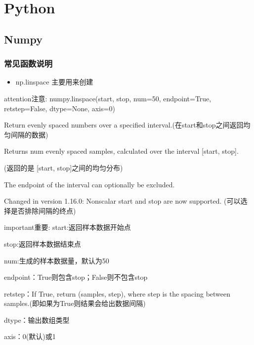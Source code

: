 \documentclass[a4paper,12pt,english]{sphinxmanual}
\begin{document}
\section{Python}
\label{\detokenize{note:python}}

\subsection{Numpy}
\label{\detokenize{note/python/numpy:numpy}}\label{\detokenize{note/python/numpy::doc}}

\subsubsection{常见函数说明}
\label{\detokenize{note/python/numpy:id1}}\begin{itemize}
\item {} 
\sphinxAtStartPar
np.linspace 主要用来创建 

\end{itemize}

\begin{sphinxadmonition}{attention}{注意:}
\sphinxAtStartPar
numpy.linspace(start, stop, num=50, endpoint=True, retstep=False, dtype=None, axis=0)

\sphinxAtStartPar
Return evenly spaced numbers over a specified interval.(在start和stop之间返回均匀间隔的数据)

\sphinxAtStartPar
Returns num evenly spaced samples, calculated over the interval {[}start, stop{]}.

\sphinxAtStartPar
(返回的是 {[}start, stop{]}之间的均匀分布)

\sphinxAtStartPar
The endpoint of the interval can optionally be excluded.

\sphinxAtStartPar
Changed in version 1.16.0: Non\sphinxhyphen{}scalar start and stop are now supported. (可以选择是否排除间隔的终点)
\end{sphinxadmonition}

\begin{sphinxadmonition}{important}{重要:}
\sphinxAtStartPar
start:返回样本数据开始点

\sphinxAtStartPar
stop:返回样本数据结束点

\sphinxAtStartPar
num:生成的样本数据量，默认为50

\sphinxAtStartPar
endpoint：True则包含stop；False则不包含stop

\sphinxAtStartPar
retstep：If True, return (samples, step), where step is the spacing between samples.(即如果为True则结果会给出数据间隔)

\sphinxAtStartPar
dtype：输出数组类型

\sphinxAtStartPar
axis：0(默认)或\sphinxhyphen{}1
\end{sphinxadmonition}
\end{document}
